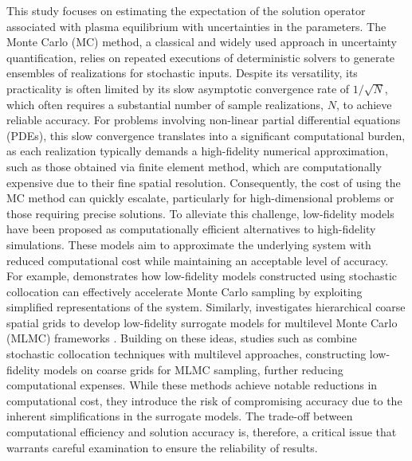This study focuses on estimating the expectation of the solution operator associated with plasma equilibrium with uncertainties in the parameters. The Monte Carlo (MC) method, a classical and widely used approach in uncertainty quantification, relies on repeated executions of deterministic solvers to generate ensembles of realizations for stochastic inputs. Despite its versatility, its practicality is often limited by its slow asymptotic convergence rate of $1/\sqrt{N}$, which often requires a substantial number of sample realizations, $N$, to achieve reliable accuracy. For problems involving non-linear partial differential equations (PDEs), this slow convergence translates into a significant computational burden, as each realization typically demands a high-fidelity numerical approximation, such as those obtained via finite element method, which are computationally expensive due to their fine spatial resolution. Consequently, the cost of using the MC method can quickly escalate, particularly for high-dimensional problems or those requiring precise solutions. To alleviate this challenge, low-fidelity models have been proposed as computationally efficient alternatives to high-fidelity simulations.  These models aim to approximate the underlying system with reduced computational cost while maintaining an acceptable level of accuracy. For example, \cite{ElLiSa:2022} demonstrates how low-fidelity models constructed using stochastic collocation can effectively accelerate Monte Carlo sampling by exploiting simplified representations of the system. Similarly,
\cite{ElLiSa:2023} investigates hierarchical coarse spatial grids to develop low-fidelity surrogate models for multilevel Monte Carlo (MLMC) frameworks \cite{BaScZo:2011,Gi:2008}. Building on these ideas, studies such as \cite{ElLiSa:2025, Li:2024} combine stochastic collocation techniques with multilevel approaches, constructing low-fidelity models on coarse grids for MLMC sampling, further reducing computational expenses. While these methods achieve notable reductions in computational cost, they introduce the risk of compromising accuracy due to the inherent simplifications in the surrogate models. The trade-off between computational efficiency and solution accuracy is, therefore, a critical issue that warrants careful examination to ensure the reliability of results.


